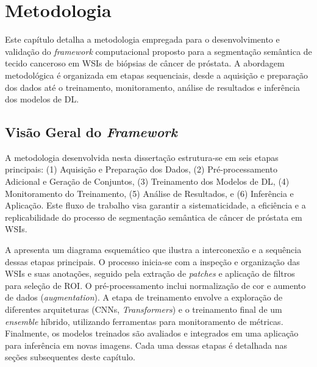 \chapter{Metodologia}\label{chp:desenvolvimento} %

Este capítulo detalha a metodologia empregada para o desenvolvimento e validação do \textit{framework} computacional proposto para a segmentação semântica de tecido canceroso em WSIs de biópsias de câncer de próstata. A abordagem metodológica é organizada em etapas sequenciais, desde a aquisição e preparação dos dados até o treinamento, monitoramento, análise de resultados e inferência dos modelos de DL.

\section{Visão Geral do \textit{Framework}}\label{sec:met_visao_geral}

A metodologia desenvolvida nesta dissertação estrutura-se em seis etapas principais: (1) Aquisição e Preparação dos Dados, (2) Pré-processamento Adicional e Geração de Conjuntos, (3) Treinamento dos Modelos de DL, (4) Monitoramento do Treinamento, (5) Análise de Resultados, e (6) Inferência e Aplicação. Este fluxo de trabalho visa garantir a sistematicidade, a eficiência e a replicabilidade do processo de segmentação semântica de câncer de próstata em WSIs.

A  apresenta um diagrama esquemático que ilustra a interconexão e a sequência dessas etapas principais. O processo inicia-se com a inspeção e organização das WSIs e suas anotações, seguido pela extração de \textit{patches} e aplicação de filtros para seleção de ROI. O pré-processamento inclui normalização de cor e aumento de dados (\textit{augmentation}). A etapa de treinamento envolve a exploração de diferentes arquiteturas (CNNs, \textit{Transformers}) e o treinamento final de um \textit{ensemble} híbrido, utilizando ferramentas para monitoramento de métricas. Finalmente, os modelos treinados são avaliados e integrados em uma aplicação para inferência em novas imagens. Cada uma dessas etapas é detalhada nas seções subsequentes deste capítulo.

